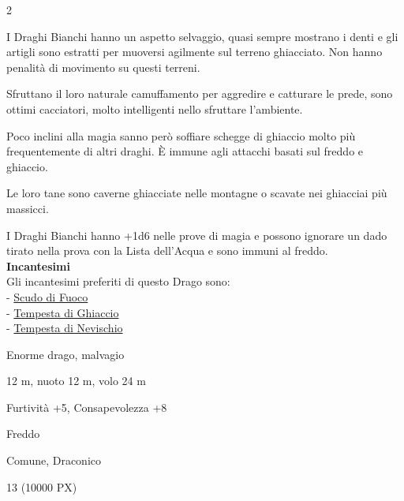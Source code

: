 \begin{multicols}{2}
{I Draghi Bianchi hanno un aspetto selvaggio, quasi sempre mostrano i denti e gli artigli sono estratti per muoversi agilmente sul terreno ghiacciato.
Non hanno penalità di movimento su questi terreni.

Sfruttano il loro naturale camuffamento per aggredire e catturare le prede, sono ottimi cacciatori, molto intelligenti nello sfruttare l'ambiente.

Poco inclini alla magia sanno però soffiare schegge di ghiaccio molto più frequentemente di altri draghi. È immune agli attacchi basati sul freddo e ghiaccio.

Le loro tane sono caverne ghiacciate nelle montagne o scavate nei ghiacciai più massicci.

I Draghi Bianchi hanno +1d6 nelle prove di magia e possono ignorare un dado tirato nella prova con la Lista dell'Acqua e sono immuni al freddo.\\

\textbf{Incantesimi}\\
Gli incantesimi preferiti di questo Drago sono:\\
- \hyperlink{Scudo di Fuoco}{Scudo di Fuoco}\\
- \hyperlink{Tempesta di Ghiaccio}{Tempesta di Ghiaccio}\\
- \hyperlink{Tempesta di Nevischio}{Tempesta di Nevischio}

\begin{description}[noitemsep, topsep=0pt, parsep=0pt, partopsep=0pt, itemsep=1pt, leftmargin=2.35cm,  labelwidth=2.2cm, itemindent=0cm, listparindent=0pt] %
\setlength{\baselineskip}{10pt}
\item[\textbf{Taglia/Tipo}] Enorme drago, malvagio
\item[\textbf{Caratt.}] 
\item[\textbf{Punti Ferita}] 
\item[\textbf{Movimento}] 12 m, nuoto 12 m, volo 24 m
\item[\textbf{Tiri Salvez.}] 
\item[\textbf{Comp.}] Furtività +5, Consapevolezza +8
\item[\textbf{Imm. Danni}] Freddo
\item[\textbf{Sensi}] 
\item[\textbf{Linguaggi}] Comune, Draconico
\item[\textbf{Sfida}] 13 (10000 PX)
\end{description}
\smallskip

}
\end{multicols}
